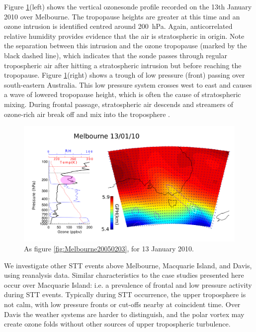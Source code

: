 \documentclass{article}
\begin{document}
  Figure \ref{fig:Melbourne20100113}(left) shows the vertical ozonesonde profile recorded on the 13th January 2010 over Melbourne.
  The tropopause heights are greater at this time and an ozone intrusion is identified centred around 200~hPa.
  Again, anticorrelated relative humidity provides evidence that the air is stratospheric in origin.
  Note the separation between this intrusion and the ozone tropopause (marked by the black dashed line), which indicates that the sonde passes through regular tropospheric air after hitting a stratospheric intrusion but before reaching the tropopause.
  Figure \ref{fig:Melbourne20100113}(right) shows a trough of low pressure (front) passing over south-eastern Australia.
  This low pressure system crosses west to east and causes a wave of lowered tropopause height, which is often the cause of stratospheric mixing.
  During frontal passage, stratospheric air descends and streamers of ozone-rich air break off and mix into the troposphere \citep{Sprenger2003}.
  
  \begin{figure}[!htbp]
    \begin{center}
    \includegraphics[width=1.0\columnwidth]{figures/Melbourne20100113.png}
    \caption{As figure \ref{fig:Melbourne20050203}, for 13 January 2010.}
    \label{fig:Melbourne20100113}
    \end{center}
  \end{figure}

  We investigate other STT events above Melbourne, Macquarie Island, and Davis, using reanalysis data.
  Similar characteristics to the case studies presented here occur over Macquarie Island: i.e. a prevalence of frontal and low pressure activity during STT events.
  Typically during STT occurrence, the upper troposphere is not calm, with low pressure fronts or cut-offs nearby at coincident time.
  Over Davis the weather systems are harder to distinguish, and the polar vortex may create ozone folds without other sources of upper tropospheric turbulence.
\end{document}
